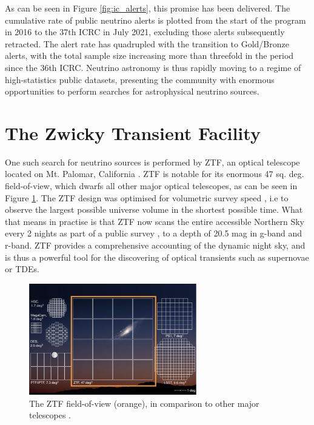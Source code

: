 \documentclass[a4paper,11pt]{article}
\begin{document}
As can be seen in Figure \ref{fig:ic_alerts}, this promise has been delivered. The cumulative rate of public neutrino alerts is plotted from the start of the program in 2016 to the 37th ICRC in July 2021, excluding those alerts subsequently retracted. The alert rate has quadrupled with the transition to Gold/Bronze alerts, with the total sample size increasing more than threefold in the period since the 36th ICRC. Neutrino astronomy is thus rapidly moving to a regime of high-statistics public datasets, presenting the community with enormous opportunities to perform searches for astrophysical neutrino sources. 

\section{The Zwicky Transient Facility}

One such search for neutrino sources is performed by ZTF, an optical telescope located on Mt. Palomar, California \cite{ztf_19_science}. ZTF is notable for its enormous 47 sq. deg. field-of-view, which dwarfs all other major optical telescopes, as can be seen in Figure \ref{fig:ztf_fov}. The ZTF design was optimised for volumetric survey speed \cite{ztf_system}, i.e to observe the largest possible universe volume in the shortest possible time. What that means in practise is that ZTF now scans the entire accessible Northern Sky every 2 nights as part of a public survey \cite{ztf_survey_19}, to a depth of 20.5 mag in g-band and r-band. ZTF provides a comprehensive accounting of the dynamic night sky, and is thus a powerful tool for the discovering of optical transients such as supernovae or TDEs.  

\begin{figure}[!ht]
	\centering \includegraphics[width=0.65\textwidth]{figures/ztf_fov}
	\caption{The ZTF field-of-view (orange), in comparison to other major telescopes \cite{laher_18}.}
	\label{fig:ztf_fov}
\end{figure}
\end{document}
